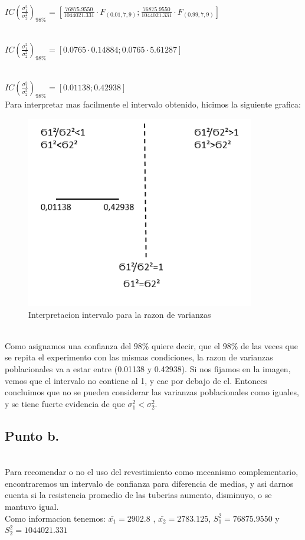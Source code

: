 \documentclass[letterpaper,12pt,onecolumn,titlepage]{article}
\begin{document}
~\\ $IC(\frac{\sigma_1^{2}}{\sigma_2^{2}})_{98\%}=\left[\frac{76875.9550}{1044021.331}\cdot F_{(0.01,7,9)}  ; \frac{76875.9550}{1044021.331}\cdot F_{(0.99,7,9)} \right]$

~\\ $IC(\frac{\sigma_1^{2}}{\sigma_2^{2}})_{98\%}=[0.0765\cdot0.14884  ;  0.0765\cdot5.61287]$

~\\ $IC(\frac{\sigma_1^{2}}{\sigma_2^{2}})_{98\%}=[0.01138 ; 0.42938]$
~\\ Para interpretar mas facilmente el intervalo obtenido, hicimos la siguiente grafica:
\begin{figure}[!h]
    \begin{center}
        \includegraphics[width=10cm]{Figuras/Grafico4.png}
        \caption{Interpretacion intervalo para la razon de varianzas}
        \label{fig:Densidad}
    \end{center}
\end{figure}
~\\ Como asignamos una confianza del $98\%$ quiere decir, que el $98\%$ de las veces que se repita el experimento con las mismas condiciones, la razon de varianzas poblacionales va a estar entre (0.01138 y 0.42938). Si nos fijamos en la imagen, vemos que el intervalo no contiene al 1, y cae por debajo de el. Entonces concluimos que no se pueden considerar las varianzas poblacionales como iguales, y se tiene fuerte evidencia de que $\sigma_{1}^2<\sigma_{2}^2$.
\subsection{Punto b.}
~\\ Para recomendar o no el uso del revestimiento como mecanismo complementario, encontraremos un intervalo de confianza para diferencia de medias, y asi darnos cuenta si la resistencia promedio de las tuberias aumento, disminuyo, o se mantuvo igual.
~\\ Como informacion tenemos: $\bar{x_1}=2902.8$ , $\bar{x_2}=2783.125$, $S_{1}^2=76875.9550$ y $S_{2}^2=1044021.331$
\end{document}
